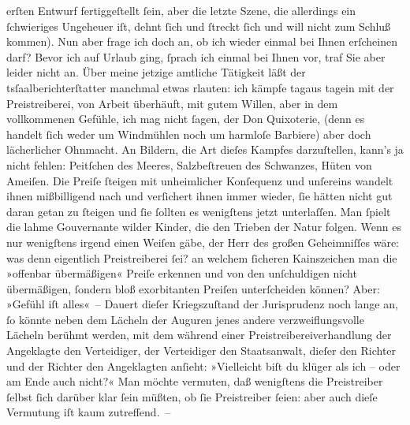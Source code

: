 \begin{ledgroupsized}[t]{13cm}
               erſten Entwurf fertiggeſtellt ſein, aber die letzte Szene, die allerdings ein
               ſchwieriges Unge{\pb}heuer iſt, dehnt ſich und ſtreckt
               ſich und will nicht zum Schluß kommen). Nun aber frage ich doch an, ob ich wieder
               einmal bei Ihnen erſcheinen darf? Bevor ich auf Urlaub ging, ſprach ich einmal bei
               Ihnen vor, traf Sie aber leider nicht an.\pend
           \pstart
           Über meine jetzige amtliche Tätigkeit läßt der tsſaalberichterſtatter manchmal etwas rlauten: ich kämpfe tagaus tagein mit der Preistreiberei, von Arbeit
               überhäuft, mit gutem Willen, aber in dem vollkommenen Gefühle, ich mag nicht ſagen,
               der Don Quixoterie,  (denn es handelt ſich weder um Windmühlen noch um
               harmloſe Barbiere) aber doch lächerlicher Ohnmacht. An Bildern, die Art dieſes
               Kampfes darzuſtellen, kann’s ja nicht fehlen: Peitſchen des Meeres, Salzbeſtreuen des
               Schwanzes, Hüten von Ameiſen. Die Preiſe ſteigen mit unheimlicher Konſequenz und
               unſereins wandelt ihnen mißbilligend nach {\pb}und
               verſichert ihnen immer wieder, ſie hätten nicht gut daran getan zu ſteigen und ſie
               ſollten es wenigſtens jetzt unterlaſſen. Man ſpielt die lahme Gouvernante wilder
               Kinder, die den Trieben der Natur folgen. Wenn es nur wenigſtens irgend einen Weiſen
               gäbe, der Herr des großen Geheimniſſes wäre: was denn eigentlich Preistreiberei ſei?
               an welchem ſicheren Kainszeichen man die »offenbar übermäßigen« Preiſe erkennen und
               von den unſchuldigen nicht übermäßigen, ſondern bloß exorbitanten Preiſen
               unterſcheiden können? Aber: »Gefühl iſt alles« –\pend
           \pstart
           Dauert dieſer Kriegszuſtand der Jurisprudenz noch lange an, ſo könnte neben dem
               Lächeln der Auguren jenes andere verzweiflungsvolle Lächeln berühmt werden, mit dem
               während einer Preistreibereiverhandlung der Angeklagte den Verteidiger, der
               Verteidiger den Staatsanwalt, dieſer den Richter und der Richter den Angeklagten
               anſieht: »Vielleicht biſt du {\pb}klüger als ich – oder am
               Ende auch nicht?« Man möchte vermuten, daß wenigſtens die Preistreiber \introOben{}\introOben{}{ }ſelbst \introOben{}ſich\introOben{} darüber klar
               ſein müßten, ob ſie Preistreiber ſeien: aber auch dieſe Vermutung iſt  kaum zutreffend. –\pend

\end{ledgroupsized}
